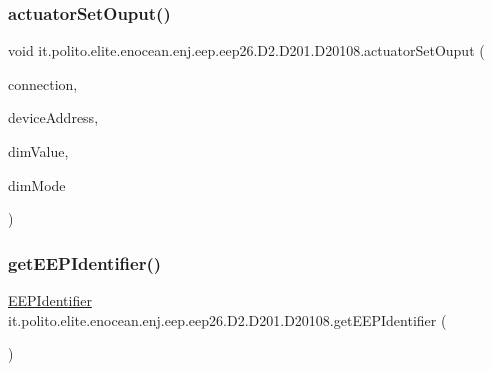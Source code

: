 \hypertarget{classit_1_1polito_1_1elite_1_1enocean_1_1enj_1_1eep_1_1eep26_1_1_d2_1_1_d201_1_1_d20108_a4f36df87662c08a006f12b9e7ffd454f}{}\label{classit_1_1polito_1_1elite_1_1enocean_1_1enj_1_1eep_1_1eep26_1_1_d2_1_1_d201_1_1_d20108_a4f36df87662c08a006f12b9e7ffd454f} 
\subsubsection{\texorpdfstring{actuator\+Set\+Ouput()}{actuatorSetOuput()}\hspace{0.1cm}{\footnotesize\ttfamily [2/2]}}
{\footnotesize\ttfamily void it.\+polito.\+elite.\+enocean.\+enj.\+eep.\+eep26.\+D2.\+D201.\+D20108.\+actuator\+Set\+Ouput (\begin{DoxyParamCaption}\item[{\hyperlink{classit_1_1polito_1_1elite_1_1enocean_1_1enj_1_1communication_1_1_en_j_connection}{En\+J\+Connection}}]{connection,  }\item[{byte \mbox{[}$\,$\mbox{]}}]{device\+Address,  }\item[{int}]{dim\+Value,  }\item[{\hyperlink{enumit_1_1polito_1_1elite_1_1enocean_1_1enj_1_1eep_1_1eep26_1_1_d2_1_1_d201_1_1_d201_dim_mode}{D201\+Dim\+Mode}}]{dim\+Mode }\end{DoxyParamCaption})}

\hypertarget{classit_1_1polito_1_1elite_1_1enocean_1_1enj_1_1eep_1_1eep26_1_1_d2_1_1_d201_1_1_d20108_a19718c7e8280b6a4295a528c2f6974dc}{}\label{classit_1_1polito_1_1elite_1_1enocean_1_1enj_1_1eep_1_1eep26_1_1_d2_1_1_d201_1_1_d20108_a19718c7e8280b6a4295a528c2f6974dc} 
\subsubsection{\texorpdfstring{get\+E\+E\+P\+Identifier()}{getEEPIdentifier()}}
{\footnotesize\ttfamily \hyperlink{classit_1_1polito_1_1elite_1_1enocean_1_1enj_1_1eep_1_1_e_e_p_identifier}{E\+E\+P\+Identifier} it.\+polito.\+elite.\+enocean.\+enj.\+eep.\+eep26.\+D2.\+D201.\+D20108.\+get\+E\+E\+P\+Identifier (\begin{DoxyParamCaption}{ }\end{DoxyParamCaption})}



